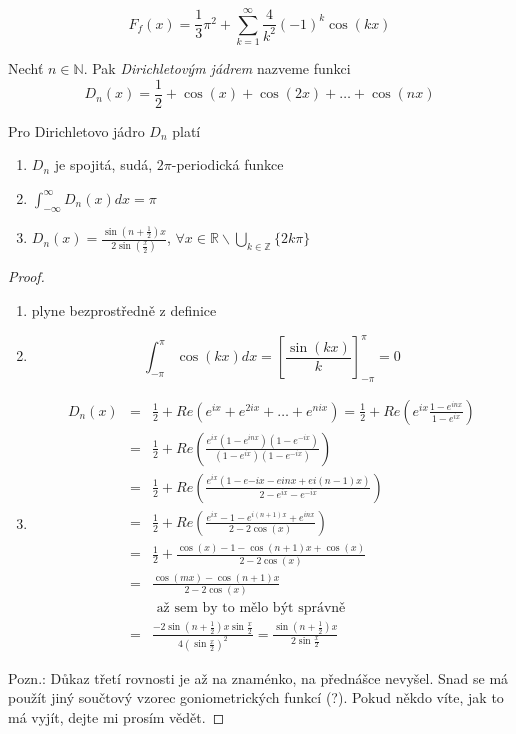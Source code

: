 $$F_f(x) = \frac{1}{3} \pi^2 + \sum_{k=1}^{\infty} \frac{4}{k^2} (-1)^k \cos (kx)$$

\begin{definice}
Nechť $n \in \mathbb{N}$. Pak \emph{Dirichletovým jádrem} nazveme funkci
$$D_n(x) = \frac{1}{2}+\cos(x)+\cos(2x)+\ldots+\cos(nx)$$
\end{definice}

\begin{vetal}
Pro Dirichletovo jádro $D_n$ platí
\begin{enumerate}
\item $D_n$ je spojitá, sudá, $2 \pi$-periodická funkce
\item $\int_{-\infty}^{\infty} D_n (x) dx = \pi$
\item $D_n(x) = \frac{\sin \left( n + \frac{1}{2} \right) x}{2 \sin \left( \frac{x}{2} \right)}$, $\forall x \in \mathbb{R} \backslash \bigcup_{k \in \mathbb{Z}} \{ 2k \pi \}$
\end{enumerate}
\end{vetal}

\begin{proof}
\begin{enumerate}
\item plyne bezprostředně z definice
\item $$\int_{-\pi}^\pi \cos(kx) dx = \left[ \frac{\sin(kx)}{k} \right]_{-\pi}^\pi = 0$$
\item
\begin{eqnarray*}
D_n(x) & = & \frac{1}{2} + Re \left( e^{ix} + e^{2ix} + \ldots + e^{nix} \right) = \frac{1}{2} + Re \left( e^{ix} \frac{1-e^{inx}}{1-e^{ix}} \right) \\
& = & \frac{1}{2} + Re \left( \frac{e^{ix} \left( 1-e^{inx} \right) \left( 1-e^{-ix} \right)}{\left( 1-e^{ix} \right) \left( 1-e^{-ix} \right)} \right) \\
& = & \frac{1}{2} + Re \left( \frac{e^{ix} \left( 1-e{-ix}-e{inx}+e{i(n-1)x} \right)}{2-e^{ix}-e^{-ix}} \right) \\
& = & \frac{1}{2} + Re \left( \frac{e^{ix} - 1 - e^{i(n+1)x} + e^{inx}}{2 - 2 \cos(x)} \right) \\
& = & \frac{1}{2} + \frac{\cos(x)-1-\cos(n+1)x + \cos(x)}{2-2\cos(x)} \\
& = & \frac{\cos(mx) - \cos(n+1)x}{2 - 2\cos(x)} \\
& & \textrm{ až sem by to mělo být správně} \\
& = & \frac{-2 \sin \left( n + \frac{1}{2} \right) x \sin \frac{x}{2}}{4 \left( \sin \frac{x}{2} \right)^{2}} = \frac{\sin \left(n + \frac{1}{2} \right) x}{2 \sin \frac{x}{2}} 
\end{eqnarray*}
\end{enumerate}

Pozn.: Důkaz třetí rovnosti je až na znaménko, na přednášce nevyšel. Snad se má použít jiný součtový vzorec goniometrických funkcí (?). Pokud někdo víte, jak to má vyjít, dejte mi prosím vědět.
\end{proof}

